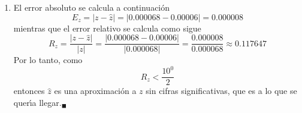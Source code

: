 \begin{solucion}
\begin{enumerate}
  \item El error absoluto se calcula a continuaci\'on
  \begin{equation*}
   E_z = \left| z - \widehat{z} \right| = \left| 0.000068 - 0.00006 \right| = 0.000008
  \end{equation*}
  mientras que el error relativo se calcula como sigue
  \begin{equation*}
   R_z = \frac{\left| z - \widehat{z} \right|}{|z|} = \frac{\left| 0.000068 - 0.00006 \right|}{|0.000068|} = \frac{0.000008}{0.000068} \approx 0.117647
  \end{equation*}
  Por lo tanto, como
  \begin{equation*}
   R_z < \frac{10^{0}}{2}
  \end{equation*}
  entonces $\widehat{z}$ es una aproximaci\'on a $z$ sin cifras significativas, que es a lo que se quer\'{\i}a llegar.${}_{\blacksquare}$
 \end{enumerate}

\end{solucion}

